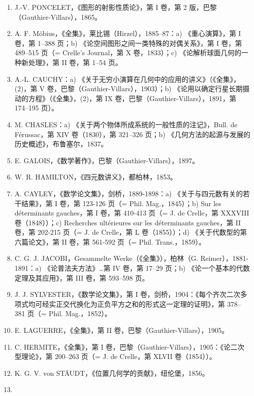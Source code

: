 \begin{enumerate}
  C. F. GAUSS，《全集》：a) Disquisitiones arithmeticae，第 I 卷，哥廷根，1870；b) 《空间的变换》，第 VIII 卷，哥廷根，1900，第 357–362 页。
\item
  J.-V. PONCELET，《图形的射影性质论》，第 I 卷，第 2 版，巴黎（Gauthier-Villars），1865。
\item
  A. F. Möbius，《全集》，莱比锡（Hirzel），1885–87：a) 《重心演算》，第 I 卷，第 1–388 页；b) 《论空间图形之间一类特殊的对偶关系》，第 I 卷，第 489–515 页（= Crelle's Journal，第 X 卷，1833）；c) 《论解析球面几何的一种新处理》，第 II 卷，第 1–54 页。
\item
  A.-L. CAUCHY：a) 《关于无穷小演算在几何中的应用的讲义》（《全集》，(2)，第 V 卷，巴黎（Gauthier-Villars），1903）；b) 《论用以确定行星长期摄动的方程》（《全集》，(2)，第 IX 卷，巴黎（Gauthier-Villars），1891，第 174–195 页）。
\item
  M. CHASLES：a) 《关于两个物体所成系统的一般性质的注记》，Bull. de Férussac，第 XIV 卷（1830），第 321–326 页；b) 《几何方法的起源与发展的历史概述》，布鲁塞尔，1837。
\item
  E. GALOIS，《数学著作》，巴黎（Gauthier-Villars），1897。
\item
  W. R. HAMILTON，《四元数讲义》，都柏林，1853。
\item
  A. CAYLEY，《数学论文集》，剑桥，1889-1898：a) 《关于与四元数有关的若干结果》，第 I 卷，第 123-126 页（= Phil. Mag.，1845）；b) Sur les déterminants gauches，第 I 卷，第 410-413 页（= J. de Crelle，第 XXXVIII 卷（1848））；c) Recherches ultérieures sur les déterminants gauches，第 II 卷，第 202-215 页（= J. de Crelle，第 L 卷（1855））；d) 《关于代数型的第六篇论文》，第 II 卷，第 561-592 页（= Phil. Trans.，1859）。
\item
  C. G. J. JACOBI，Gesammelte Werke（《全集》），柏林（G. Reimer），1881-1891：a) 《论普法夫方法》\ldots 第 IV 卷，第 17–29 页；b) 《论一个基本的代数定理及其应用》，第 III 卷，第 593–598 页。
\item
  J. J. SYLVESTER，《数学论文集》，第 I 卷，剑桥，1904：《每个齐次二次多项式均可经实正交代换化为正负平方之和的形式这一定理的证明》，第 378–381 页（= Phil. Mag.，1852）。
\item
  E. LAGUERRE，《全集》，第 II 卷，巴黎（Gauthier-Villars），1905。
\item
  C. HERMITE，《全集》，第 I 卷，巴黎（Gauthier-Villars），1905：《论二次型理论》，第 200–263 页（= J. de Crelle，第 XLVII 卷（1854））。
\item
  K. G. V. von STÄUDT，《位置几何学的贡献》，纽伦堡，1856。
\item

\end{enumerate}
